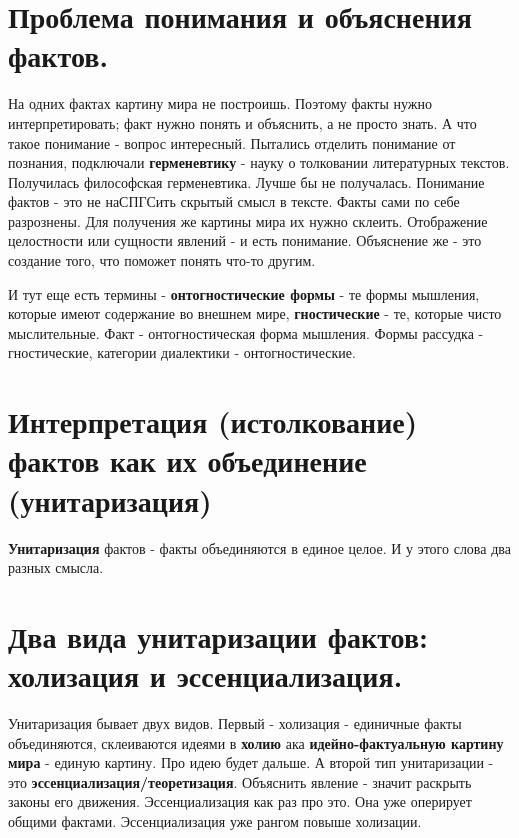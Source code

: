 \section{ Проблема понимания и объяснения фактов.}
На одних фактах картину мира не построишь. Поэтому факты нужно интерпретировать; факт нужно понять и объяснить, а не просто знать. А что такое понимание - вопрос интересный. Пытались отделить понимание от познания, подключали \textbf{герменевтику} - науку о толковании литературных текстов. Получилась философская герменевтика. Лучше бы не получалась. Понимание фактов - это не наСПГСить скрытый смысл в тексте. Факты сами по себе разрознены. Для получения же картины мира их нужно склеить. Отображение целостности или сущности явлений - и есть понимание. Объяснение же - это создание того, что поможет понять что-то другим.

И тут еще есть термины - \textbf{онтогностические формы} - те формы мышления, которые имеют содержание во внешнем мире, \textbf{гностические} - те, которые чисто мыслительные. Факт - онтогностическая форма мышления. Формы рассудка - гностические, категории диалектики - онтогностические.

\section{ Интерпретация (истолкование) фактов как их объединение (унитаризация)}
\textbf{Унитаризация} фактов - факты объединяются в единое целое. И у этого слова два разных смысла.

\section{ Два вида унитаризации фактов: холизация и эссенциализация.}
Унитаризация бывает двух видов. Первый - холизация - единичные факты объединяются, склеиваются идеями  в \textbf{холию} ака \textbf{идейно-фактуальную картину мира} - единую картину. Про идею будет дальше. А второй тип унитаризации - это \textbf{эссенциализация/теоретизация}. Объяснить явление - значит раскрыть законы его движения. Эссенциализация как раз про это. Она уже оперирует общими фактами. Эссенциализация уже рангом повыше холизации.

